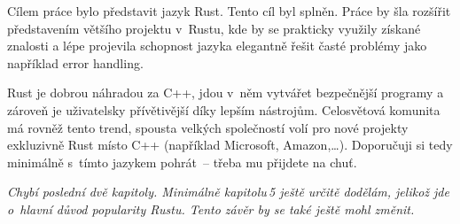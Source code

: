 \documentclass[main.tex]{subfiles}
\begin{document}

Cílem práce bylo představit jazyk Rust. Tento cíl byl splněn. Práce by šla rozšířit
představením většího projektu v~Rustu, kde by se prakticky využily získané znalosti a lépe
projevila schopnost jazyka elegantně řešit časté problémy jako například error handling.

Rust je dobrou náhradou za C++, jdou v~něm vytvářet bezpečnější programy a zároveň je
uživatelsky přívětivější díky lepším nástrojům. Celosvětová komunita má rovněž tento
trend, spousta velkých společností volí pro nové projekty exkluzivně Rust místo C++
(například Microsoft, Amazon,\dots). Doporučuji si tedy minimálně s~tímto jazykem
pohrát~-- třeba mu přijdete na chuť.

\emph{
    Chybí poslední dvě kapitoly. Minimálně kapitolu\,5 ještě určitě dodělám, jelikož jde
    o~hlavní důvod popularity Rustu. Tento závěr by se také ještě mohl změnit.
}
\end{document}
